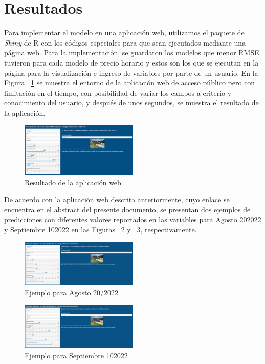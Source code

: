 \documentclass[conference, 10pt]{IEEEtran}
\begin{document}
\section{Resultados}
Para implementar el modelo en una aplicación web, utilizamos el paquete de \textit{Shiny} de R con los códigos especiales para que sean ejecutados mediante una página web. Para la implementación, se guardaron los modelos que menor RMSE tuvieron para cada modelo de precio horario y estos son los que se ejecutan en la página para la visualización e ingreso de variables por parte de un usuario. En la Figura ~\ref{fig_3} se muestra el entorno de la aplicación web de acceso público pero con limitación en el tiempo, con posibilidad de variar los campos a criterio y conocimiento del usuario, y después de unos segundos, se muestra el resultado de la aplicación. 

\begin{figure}[htbp]
\centerline{\includegraphics[width=0.5\textwidth]{../Images/Resultado_Trabajo_final.png}}
\caption{Resultado de la aplicación web}
\label{fig_3}
\end{figure}
De acuerdo con la aplicación web descrita anteriormente, cuyo enlace se encuentra en el abstract del presente documento, se presentan dos ejemplos de predicciones con diferentes valores reportados en las variables para Agosto 20\/2022 y Septiembre 10\/2022 en las Figuras ~\ref{fig_4}  y ~\ref{fig_5}, respectivamente.

\begin{figure}[htbp]
\centerline{\includegraphics[width=0.5\textwidth]{../Images/AppWeb1.png}}
\caption{Ejemplo para Agosto 20/2022}
\label{fig_4}
\end{figure}


\begin{figure}[htbp]
\centerline{\includegraphics[width=0.5\textwidth]{../Images/AppWeb2.png}}
\caption{Ejemplo para Septiembre 10\/2022}
\label{fig_5}
\end{figure}
\end{document}
